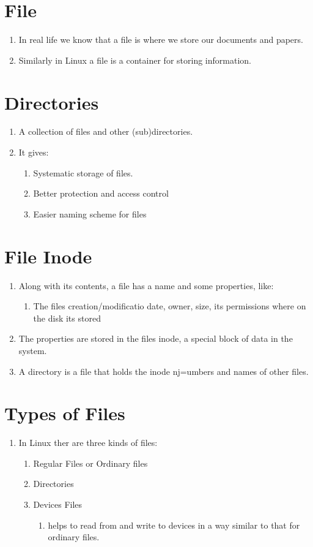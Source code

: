 \documentclass[12pt, a4paper]{report}
\begin{document}
\section{File}
\begin{enumerate}
\item In real life we know that a file is where we store our documents and papers.
\item Similarly in Linux a file is a container for storing information.
\end{enumerate}
\section{Directories}
\begin{enumerate}
\item A collection of files and other (sub)directories.
\item It gives:
\begin{enumerate}
\item Systematic storage of files.
\item Better protection and access control
\item Easier naming scheme for files
\end{enumerate}
\end{enumerate}
\section{File Inode}
\begin{enumerate}
\item Along with its contents, a file has a name and some properties, like:
\begin{enumerate}
\item The files creation/modificatio date, owner, size, its permissions where on the disk its stored
\end{enumerate}
\item The properties are stored in the files inode, a special block of data in the system.
\item A directory is a file that holds the inode nj=umbers and names of other files.
\end{enumerate}
\section{Types of Files}
\begin{enumerate}
\item In Linux ther are three kinds of files:
\begin{enumerate}
\item Regular Files or Ordinary files
\item Directories
\item Devices Files
\begin{enumerate}
\item helps to read from and write to devices in a way similar to that for ordinary files.
\end{enumerate}
\end{enumerate}
\end{enumerate}
\end{document}
